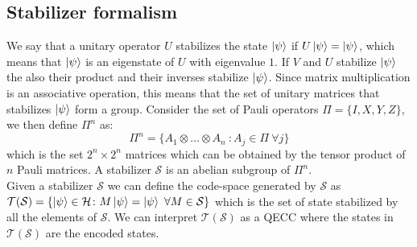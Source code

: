 \documentclass{article}
\begin{document}
	\subsection{Stabilizer formalism}
	We say that a unitary operator $U$ stabilizes the state $\ket{\psi}$ if $U\ket{\psi} = \ket{\psi}$, which means that $\ket{\psi}$ is an eigenstate of $U$ with eigenvalue $1$. If $V$ and $U$ stabilize $\ket{\psi}$ the also their product and their inverses stabilize $\ket{\psi}$. Since matrix multiplication is an associative operation, this means that the set of unitary matrices that stabilizes $\ket{\psi}$ form a group. 	
	Consider the set of Pauli operators $\Pi = \{I,X,Y,Z\}$, we then define $\Pi^n$ as:
	\[\Pi^n = \{A_1\otimes \dots \otimes A_n\ \colon A_j \in \Pi\ \forall j\}\]
	which is the set $2^n\times2^n$ matrices which can be obtained by the tensor product of $n$ Pauli matrices. A stabilizer $\mathcal{S}$ is an abelian subgroup of $\Pi^n$. \\
 	Given a stabilizer $\mathcal{S}$ we can define the code-space generated by $\mathcal{S}$ as $\mathcal{T}(\mathcal{S}) = \{ \ket{\psi} \in \mathcal{H} \colon M\ket{\psi} = \ket{\psi }\ \forall M \in \mathcal{S}\}$ which is the set of state stabilized by all the elements of $\mathcal{S}$. We can interpret $\mathcal{T}(\mathcal{S})$ as a QECC where the states in $\mathcal{T}(\mathcal{S})$ are the encoded states.
	
\end{document}
